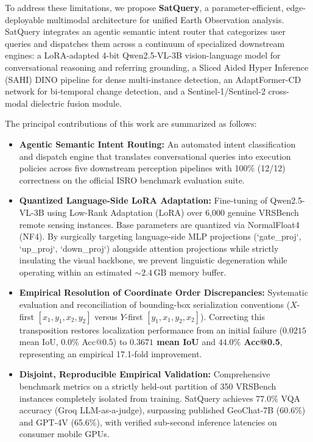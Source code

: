 \documentclass[lettersize,journal]{IEEEtran}
\begin{document}
To address these limitations, we propose \textbf{SatQuery}, a parameter-efficient, edge-deployable multimodal architecture for unified Earth Observation analysis. SatQuery integrates an agentic semantic intent router that categorizes user queries and dispatches them across a continuum of specialized downstream engines: a LoRA-adapted 4-bit Qwen2.5-VL-3B vision-language model for conversational reasoning and referring grounding, a Sliced Aided Hyper Inference (SAHI) DINO pipeline for dense multi-instance detection, an AdaptFormer-CD network for bi-temporal change detection, and a Sentinel-1/Sentinel-2 cross-modal dielectric fusion module.

The principal contributions of this work are summarized as follows:
\begin{itemize}
    \item \textbf{Agentic Semantic Intent Routing:} An automated intent classification and dispatch engine that translates conversational queries into execution policies across five downstream perception pipelines with 100\% (12/12) correctness on the official ISRO benchmark evaluation suite.
    \item \textbf{Quantized Language-Side LoRA Adaptation:} Fine-tuning of Qwen2.5-VL-3B using Low-Rank Adaptation (LoRA) over 6,000 genuine VRSBench remote sensing instances. Base parameters are quantized via NormalFloat4 (NF4). By surgically targeting language-side MLP projections (`gate\_proj`, `up\_proj`, `down\_proj`) alongside attention projections while strictly insulating the visual backbone, we prevent linguistic degeneration while operating within an estimated $\sim 2.4\,\text{GB}$ memory buffer.
    \item \textbf{Empirical Resolution of Coordinate Order Discrepancies:} Systematic evaluation and reconciliation of bounding-box serialization conventions ($X$-first $[x_1, y_1, x_2, y_2]$ versus $Y$-first $[y_1, x_1, y_2, x_2]$). Correcting this transposition restores localization performance from an initial failure ($0.0215$ mean IoU, 0.0\% Acc@0.5) to \textbf{$0.3671$ mean IoU} and \textbf{$44.0\%$ Acc@0.5}, representing an empirical 17.1-fold improvement.
    \item \textbf{Disjoint, Reproducible Empirical Validation:} Comprehensive benchmark metrics on a strictly held-out partition of 350 VRSBench instances completely isolated from training. SatQuery achieves 77.0\% VQA accuracy (Groq LLM-as-a-judge), surpassing published GeoChat-7B (60.6\%) and GPT-4V (65.6\%), with verified sub-second inference latencies on consumer mobile GPUs.
\end{itemize}
\end{document}
